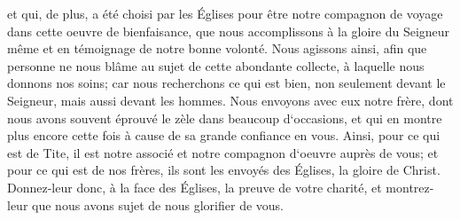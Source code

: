 \verse et qui, de plus, a été choisi par les Églises pour être notre compagnon de voyage dans cette oeuvre de bienfaisance, que nous accomplissons à la gloire du Seigneur même et en témoignage de notre bonne volonté. 
\verse Nous agissons ainsi, afin que personne ne nous blâme au sujet de cette abondante collecte, à laquelle nous donnons nos soins; 
\verse car nous recherchons ce qui est bien, non seulement devant le Seigneur, mais aussi devant les hommes. 
\verse Nous envoyons avec eux notre frère, dont nous avons souvent éprouvé le zèle dans beaucoup d`occasions, et qui en montre plus encore cette fois à cause de sa grande confiance en vous. 
\verse Ainsi, pour ce qui est de Tite, il est notre associé et notre compagnon d`oeuvre auprès de vous; et pour ce qui est de nos frères, ils sont les envoyés des Églises, la gloire de Christ. 
\verse Donnez-leur donc, à la face des Églises, la preuve de votre charité, et montrez-leur que nous avons sujet de nous glorifier de vous. 

